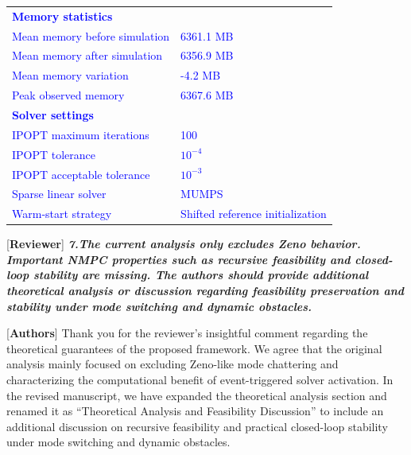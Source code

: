 \documentclass[12pt, twosides]{article}
\theoremstyle{definition}
\begin{document}
\begin{table}[h]
\begin{tabular}{p{}p{}}
 		\midrule
 		\multicolumn{2}{l}{\textbf{\textcolor{blue}{Memory statistics}}} \\
 		\textcolor{blue}{Mean memory before simulation} & \textcolor{blue}{6361.1 MB} \\
 		\textcolor{blue}{Mean memory after simulation} & \textcolor{blue}{6356.9 MB} \\
 		\textcolor{blue}{Mean memory variation} & \textcolor{blue}{-4.2 MB} \\
 		\textcolor{blue}{Peak observed memory} & \textcolor{blue}{6367.6 MB} \\
 		\midrule
 		\multicolumn{2}{l}{\textbf{\textcolor{blue}{Solver settings}}} \\
 		\textcolor{blue}{IPOPT maximum iterations} & \textcolor{blue}{100} \\
 		\textcolor{blue}{IPOPT tolerance} & \textcolor{blue}{$10^{-4}$} \\
 		\textcolor{blue}{IPOPT acceptable tolerance} & \textcolor{blue}{$10^{-3}$} \\
 		\textcolor{blue}{Sparse linear solver} & \textcolor{blue}{MUMPS} \\
 		\textcolor{blue}{Warm-start strategy} & \textcolor{blue}{Shifted reference initialization} \\
 		\bottomrule
 	\end{tabular}
 \end{table}

\textcolor[rgb]{0.00,0.00,1.00}{[\textbf {Reviewer}]} \textit{\textbf{7.The current analysis only excludes Zeno behavior. Important NMPC properties such as recursive feasibility and closed-loop stability are missing. The authors should provide additional theoretical analysis or discussion regarding feasibility preservation and stability under mode switching and dynamic obstacles.}}

\textcolor[rgb]{0.00,0.00,1.00}{[\textbf{Authors}]} Thank you for the reviewer's insightful comment regarding the theoretical guarantees of the proposed framework. We agree that the original analysis mainly focused on excluding Zeno-like mode chattering and characterizing the computational benefit of event-triggered solver activation. In the revised manuscript, we have expanded the theoretical analysis section and renamed it as ``Theoretical Analysis and Feasibility Discussion'' to include an additional discussion on recursive feasibility and practical closed-loop stability under mode switching and dynamic obstacles.
\end{document}
